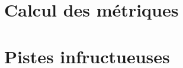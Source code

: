 \documentclass[a4paper]{article}
\begin{document}
\begin{appendices}
\section{Calcul des métriques}
\label{sec: metrics}


\section{Pistes infructueuses}
\label{sec: pistes infructruces}



\end{appendices}
\end{document}
